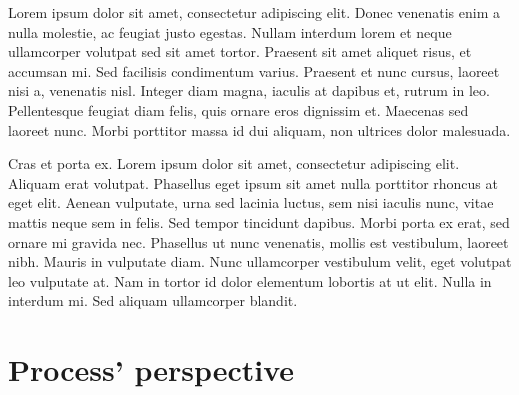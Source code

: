 \documentclass[12pt, a4paper]{book}
\begin{document}

Lorem ipsum dolor sit amet, consectetur adipiscing elit. Donec venenatis enim a nulla molestie, ac feugiat justo egestas. Nullam interdum lorem et neque ullamcorper volutpat sed sit amet tortor. Praesent sit amet aliquet risus, et accumsan mi. Sed facilisis condimentum varius. Praesent et nunc cursus, laoreet nisi a, venenatis nisl. Integer diam magna, iaculis at dapibus et, rutrum in leo. Pellentesque feugiat diam felis, quis ornare eros dignissim et. Maecenas sed laoreet nunc. Morbi porttitor massa id dui aliquam, non ultrices dolor malesuada.

Cras et porta ex. Lorem ipsum dolor sit amet, consectetur adipiscing elit. Aliquam erat volutpat. Phasellus eget ipsum sit amet nulla porttitor rhoncus at eget elit. Aenean vulputate, urna sed lacinia luctus, sem nisi iaculis nunc, vitae mattis neque sem in felis. Sed tempor tincidunt dapibus. Morbi porta ex erat, sed ornare mi gravida nec. Phasellus ut nunc venenatis, mollis est vestibulum, laoreet nibh. Mauris in vulputate diam. Nunc ullamcorper vestibulum velit, eget volutpat leo vulputate at. Nam in tortor id dolor elementum lobortis at ut elit. Nulla in interdum mi. Sed aliquam ullamcorper blandit.

\chapter{Process' perspective}
\end{document}
